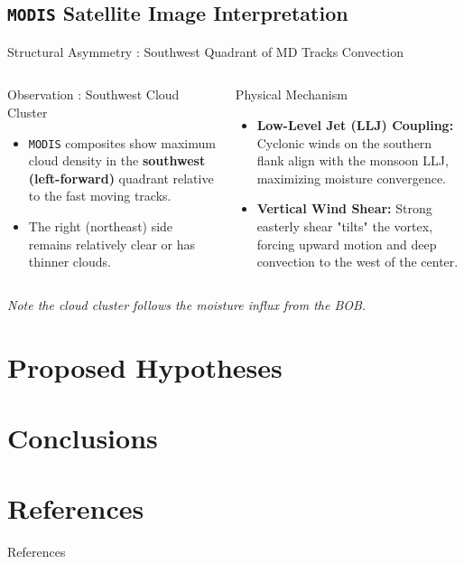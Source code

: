 \documentclass[8pt, aspectratio=169]{beamer}
\begin{document}
\subsection{\texttt{MODIS} Satellite Image Interpretation}
\begin{frame}{Structural Asymmetry : Southwest Quadrant of MD Tracks Convection}
    \begin{columns}[T]
        \footnotesize
        \begin{block}{Observation : Southwest Cloud Cluster}
            \footnotesize
            \begin{itemize}
                \item \texttt{MODIS} composites show maximum cloud density in the \textbf{southwest (left-forward)} quadrant relative to the fast moving tracks.
                \item The right (northeast) side remains relatively clear or has thinner clouds.
            \end{itemize}
        \end{block}

        \footnotesize
        \begin{block}{Physical Mechanism}
            \footnotesize
            \begin{itemize}
                \item \textbf{Low-Level Jet (LLJ) Coupling:} Cyclonic winds on the southern flank align with the monsoon LLJ, maximizing moisture convergence.
                \item \textbf{Vertical Wind Shear:} Strong easterly shear "tilts" the vortex, forcing upward motion and deep convection to the west of the center.
            \end{itemize}
        \end{block}
    \end{columns}

    \vspace{0.5cm}
    \tiny \textit{Note the cloud cluster follows the moisture influx from the BOB.}
\end{frame}


\section{Proposed Hypotheses}


\section{Conclusions}


\section{References}
\begin{frame}[allowframebreaks]{References}
    \nocite{*}
    \scriptsize
    \printbibliography
\end{frame}
\end{document}
